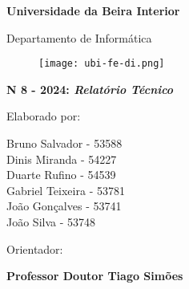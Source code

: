 \thispagestyle{empty}
\setcounter{page}{-1}

\begin{center}
\begin{Huge}
\textbf{Universidade da Beira Interior}
\end{Huge}
\end{center}

\begin{center}
\begin{Huge}
Departamento de Informática
\end{Huge}
\end{center}

\vspace{0,07cm}
\begin{figure}[!htb]
\centering
\texttt{[image: ubi-fe-di.png]}
\end{figure}

\vspace{0.5cm}
\begin{center}
\begin{Large}
\textbf{N\textordmasculine{} 8 - 2024: \emph{Relatório Técnico}}
\end{Large}
\end{center}

\vspace{0.5cm}
\begin{center}
\begin{normalsize}
\begin{large}
Elaborado por:
\end{large}
\end{normalsize}
\end{center}

\begin{center}
\begin{large}
\begin{bfseries}
Bruno Salvador - 53588 \\
Dinis Miranda - 54227 \\
Duarte Rufino - 54539 \\
Gabriel Teixeira - 53781 \\
João Gonçalves - 53741 \\
João Silva - 53748 \\
\end{bfseries}
\end{large}
\end{center}

\vspace{0,5cm}
\begin{center}
\begin{normalsize}
\begin{large}
Orientador:
\end{large}
\end{normalsize}
\end{center}

\begin{center}
\begin{large}
\textbf{Professor Doutor Tiago Simões}
\end{large}
\end{center}

\vspace{0.5cm}
\begin{center}
\begin{normalsize}
\text{\today}
\end{normalsize}
\end{center}